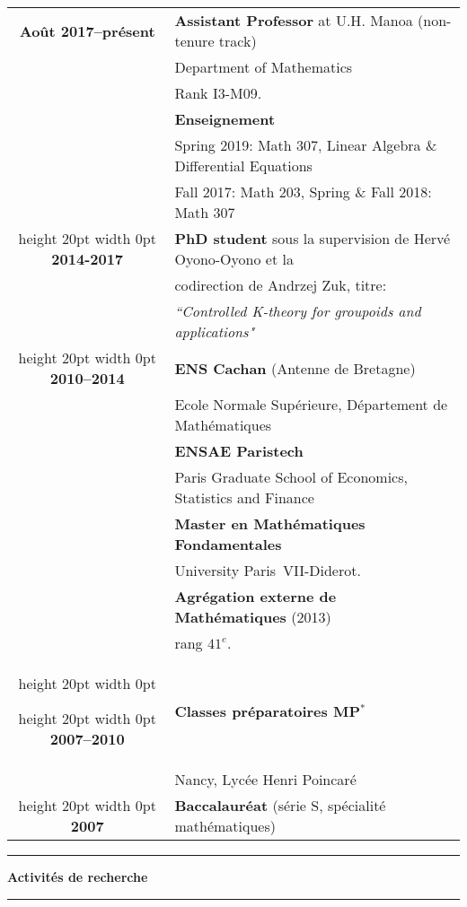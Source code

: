 \documentclass[a4paper,11pt]{article}
\newcommand\espace{\vrule height 20pt width 0pt}
\newcommand{\titre}[1]{%
	\begin{center}
	\bigskip
	\rule{\textwidth}{1pt}
	\par\vspace{0.1cm}
        \textbf{\large #1}
	\par\rule{\textwidth}{1pt}
	\end{center}
	\bigskip
	}
\begin{document}
\begin{tabular}{cp{}}

\textbf{Ao\^{u}t 2017--pr\'{e}sent} &  \textbf{Assistant Professor} at U.H. Manoa (non-tenure track)  \\
						& Department of Mathematics\\
						& Rank I3-M09. \\
						& \textbf{Enseignement} \\
						& Spring 2019: Math 307, Linear Algebra \& Differential Equations\\  
						& Fall 2017: Math 203, Spring \& Fall 2018: Math 307\\
						\espace
\textbf{2014-2017} &  \textbf{PhD student} sous la supervision de Hervé Oyono-Oyono et la  \\
						& codirection de Andrzej Zuk, titre: \\	
						& \textit{``Controlled K-theory for groupoids and applications"} \\
\espace
\textbf{2010--2014} &  \textbf{ENS Cachan} (Antenne de Bretagne) \\
				    & 	Ecole Normale Supérieure, D\'epartement de Math\'ematiques \\
                              & \textbf{ENSAE Paristech}\\
				&	Paris Graduate School of Economics, Statistics and Finance\\
                                   & \textbf{Master en Math\'ematiques Fondamentales}\\  & University Paris~VII-Diderot. \\
                                   & \textbf{Agrégation externe de Mathématiques} (2013) \\ 
							& rang $41^e$. \\
\espace

\espace
\textbf{2007--2010} &\textbf{Classes préparatoires MP$^*$ } \\
					& Nancy, Lycée Henri Poincaré\\

\espace
\textbf{2007} & \textbf{Baccalauréat} (série S, sp\'ecialit\'e math\'ematiques) 
 \\

\end{tabular}

\newpage
\titre{Activit\'es de recherche}
\end{document}
